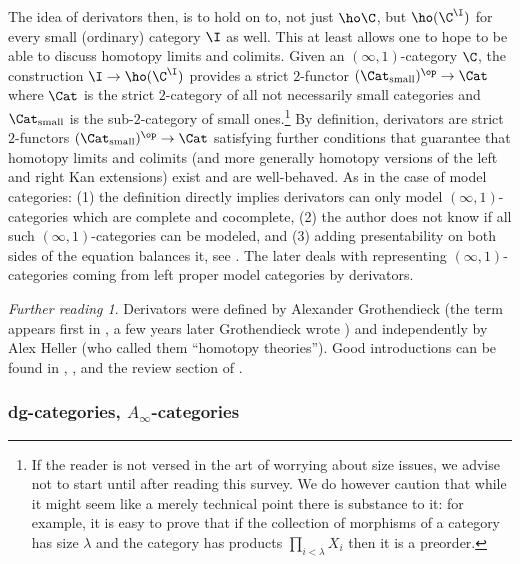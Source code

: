 \documentclass{conm-p-l}
\theoremstyle{definition} \newtheorem{definition}[theorem]{Definition}
\theoremstyle{remark} \newtheorem{remark}[theorem]{Remark}
\newtheorem*{further}{Further reading}
\numberwithin{equation}{section}
\newcommand{\oo}{\infty}
\newcommand{\io}{$(\oo,1)$}
\begin{document}
The idea of derivators then, is to hold on to, not just $\ho\C$, but
$\ho(\C^\I)$ for every small (ordinary) category $\I$ as well. This at
least allows one to hope to be able to discuss homotopy limits and
colimits. Given an \io-category $\C$, the construction $\I \to
\ho(\C^\I)$ provides a strict $2$-functor $(\Cat_\text{small})^{\op}
\to \Cat$ where $\Cat$ is the strict $2$-category of all not
necessarily small categories and $\Cat_\text{small}$ is the
sub-$2$-category of small ones.\footnote{If the reader is not versed
in the art of worrying about size issues, we advise not to start until
after reading this survey. We do however caution that while it might
seem like a merely technical point there is substance to it: for
example, it is easy to prove that if the collection of morphisms of a
category has size $\lambda$ and the category has products
$\prod_{i<\lambda} X_i$ then it is a preorder.} By definition,
derivators are strict $2$-functors $(\Cat_\text{small})^{\op} \to
\Cat$ satisfying further conditions that guarantee that homotopy
limits and colimits (and more generally homotopy versions of the left
and right Kan extensions) exist and are well-behaved. As in the case
of model categories: (1) the definition directly implies derivators
can only model \io-categories which are complete and cocomplete, (2)
the author does not know if all such \io-categories can be modeled,
and (3) adding presentability on both sides of the equation balances
it, see \cite{RenaudinPres}. The later \cite{RenaudinLP} deals with
representing \io-categories coming from left proper model categories
by derivators.

\begin{further} Derivators were defined by Alexander Grothendieck (the
term appears first in \cite{PursuingStacks}, a few years later
Grothendieck wrote \cite{Derivateurs}) and independently by Alex
Heller \cite{Heller} (who called them ``homotopy theories''). Good
introductions can be found in \cite{Maltsiniotis}, \cite{GrothDer}, and
the review section of \cite{ShulmanPontoGroth}. \end{further}

\subsubsection{dg-categories, $A_\oo$-categories}
\end{document}
